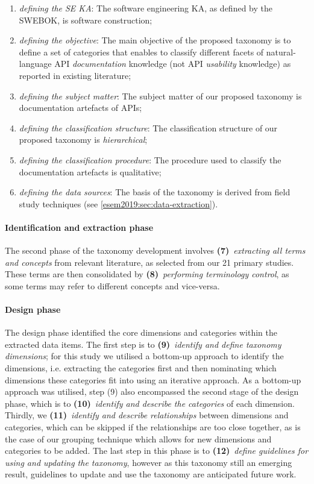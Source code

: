 \begin{enumerate}[label=\textbf{(\arabic*)}]
  \item \textit{defining the SE KA}: The software engineering KA, as defined by the SWEBOK, is software construction;
  \item \textit{defining the objective}: The main objective of the proposed taxonomy is to define a set of categories that enables to classify different facets of natural-language API \textit{documentation} knowledge (not API \textit{usability} knowledge) as reported in existing literature;
  \item \textit{defining the subject matter}: The subject matter of our proposed taxonomy is  documentation artefacts of APIs;
  \item \textit{defining the classification structure}: The classification structure of our  proposed taxonomy is \textit{hierarchical};
  \item \textit{defining the classification procedure}: The procedure used to classify the documentation artefacts is qualitative; 
  \item \textit{defining the data sources}: The basis of the taxonomy is derived from field study techniques (see \cref{esem2019:sec:data-extraction}).
\end{enumerate}

\paragraph{Identification and extraction phase} The second phase of the taxonomy development involves \textbf{(7)}~\textit{extracting all terms and concepts} from relevant literature, as selected from our 21 primary studies. These terms are then consolidated by \textbf{(8)}~\textit{performing terminology control}, as some terms may refer to different concepts and vice-versa.

\paragraph{Design phase} The design phase identified the core dimensions and categories within the extracted data items. The first step is to \textbf{(9)}~\textit{identify and define taxonomy dimensions}; for this study we utilised a bottom-up approach to identify the dimensions, i.e. extracting the categories first and then nominating which dimensions these categories fit into using an iterative approach. As a bottom-up approach was utilised, step (9) also encompassed the second stage of the design phase, which is to \textbf{(10)}~\textit{identify and describe the categories} of each dimension. Thirdly, we \textbf{(11)}~\textit{identify and describe relationships} between dimensions and categories, which can be skipped if the relationships are too close together, as is the case of our grouping technique which allows for new dimensions and categories to be added. The last step in this phase is to \textbf{(12)}~\textit{define guidelines for using and updating the taxonomy}, however as this taxonomy still an emerging result, guidelines to update and use the taxonomy are anticipated future work.

